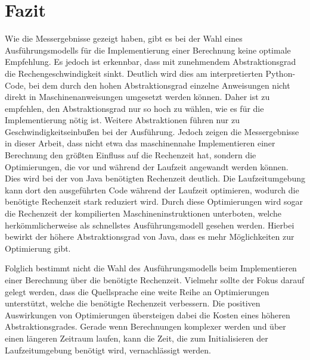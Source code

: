 \documentclass[11pt, parskip=half]{scrartcl}       %
\begin{document}
\section{Fazit}

Wie die Messergebnisse gezeigt haben, gibt es bei der Wahl eines Ausführungsmodells für die Implementierung einer Berechnung keine optimale Empfehlung.
Es jedoch ist erkennbar, dass mit zunehmendem Abstraktionsgrad die Rechengeschwindigkeit sinkt.
Deutlich wird dies am interpretierten Python-Code, bei dem durch den hohen Abstraktionsgrad einzelne Anweisungen nicht direkt in Maschinenanweisungen umgesetzt werden können.
Daher ist zu empfehlen, den Abstraktionsgrad nur so hoch zu wählen, wie es für die Implementierung nötig ist.
Weitere Abstraktionen führen nur zu Geschwindigkeitseinbußen bei der Ausführung.
Jedoch zeigen die Messergebnisse in dieser Arbeit, dass nicht etwa das maschinennahe Implementieren einer Berechnung den größten Einfluss auf die Rechenzeit hat, sondern die Optimierungen, die vor und während der Laufzeit angewandt werden können.
Dies wird bei der von Java benötigten Rechenzeit deutlich.
Die Laufzeitumgebung kann dort den ausgeführten Code während der Laufzeit optimieren, wodurch die benötigte Rechenzeit stark reduziert wird.
Durch diese Optimierungen wird sogar die Rechenzeit der kompilierten Maschineninstruktionen unterboten, welche herkömmlicherweise als schnellstes Ausführungsmodell gesehen werden.
Hierbei bewirkt der höhere Abstraktionsgrad von Java, dass es mehr Möglichkeiten zur Optimierung gibt.

Folglich bestimmt nicht die Wahl des Ausführungsmodells beim Implementieren einer Berechnung über die benötigte Rechenzeit.
Vielmehr sollte der Fokus darauf gelegt werden, dass die Quellsprache eine weite Reihe an Optimierungen unterstützt, welche die benötigte Rechenzeit verbessern.
Die positiven Auswirkungen von Optimierungen übersteigen dabei die Kosten eines höheren Abstraktionsgrades.
Gerade wenn Berechnungen komplexer werden und über einen längeren Zeitraum laufen, kann die Zeit, die zum Initialisieren der Laufzeitumgebung benötigt wird, vernachlässigt werden.


\newpage

{}

\end{document}
